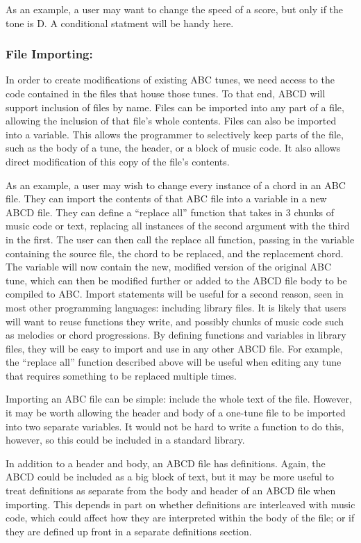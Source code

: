         As an example, a user may want to change the speed of a score, but only if the tone is D. A conditional statment will be handy here.

    \subsubsection{File Importing:}
    In order to create modifications of existing ABC tunes, we need access to the code contained in the files that house those tunes. To that end, ABCD will support inclusion of files by name. Files can be imported into any part of a file, allowing the inclusion of that file's whole contents. Files can also be imported into a variable. This allows the programmer to selectively keep parts of the file, such as the body of a tune, the header, or a block of music code. It also allows direct modification of this copy of the file's contents. 
    
    As an example, a user may wish to change every instance of a chord in an ABC file. They can import the contents of that ABC file into a variable in a new ABCD file. They can define a “replace all” function that takes in 3 chunks of music code or text, replacing all instances of the second argument with the third in the first. The user can then call the replace all function, passing in the variable containing the source file, the chord to be replaced, and the replacement chord. The variable will now contain the new, modified version of the original ABC tune, which can then be modified further or added to the ABCD file body to be compiled to ABC.
    Import statements will be useful for a second reason, seen in most other programming languages: including library files. It is likely that users will want to reuse functions they write, and possibly chunks of music code such as melodies or chord progressions. By defining functions and variables in library files, they will be easy to import and use in any other ABCD file. For example, the “replace all” function described above will be useful when editing any tune that requires something to be replaced multiple times.
    
    Importing an ABC file can be simple: include the whole text of the file. However, it may be worth allowing the header and body of a one-tune file to be imported into two separate variables. It would not be hard to write a function to do this, however, so this could be included in a standard library.
    
    In addition to a header and body, an ABCD file has definitions. Again, the ABCD could be included as a big block of text, but it may be more useful to treat definitions as separate from the body and header of an ABCD file when importing. This depends in part on whether definitions are interleaved with music code, which could affect how they are interpreted within the body of the file; or if they are defined up front in a separate definitions section.

